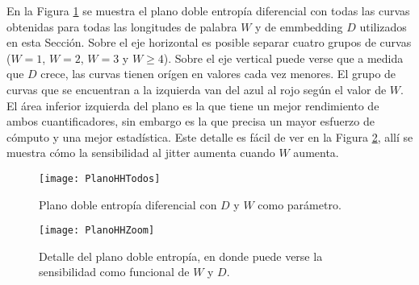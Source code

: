 En la Figura \ref{fig:PlanoHHTodos} se muestra el plano doble entropía diferencial con todas las curvas obtenidas para todas las longitudes de palabra $W$ y de emmbedding $D$ utilizados en esta Sección.
Sobre el eje horizontal es posible separar cuatro grupos de curvas ($W = 1$, $W = 2$, $W = 3$ y $W \geq 4$).
Sobre el eje vertical puede verse que a medida que $D$ crece, las curvas tienen orígen en valores cada vez menores.
El grupo de curvas que se encuentran a la izquierda van del azul al rojo según el valor de $W$.
El área inferior izquierda del plano es la que tiene un mejor rendimiento de ambos cuantificadores, sin embargo es la que precisa un mayor esfuerzo de cómputo y una mejor estadística.
Este detalle es fácil de ver en la Figura \ref{fig:PlanoHHZoom}, allí se muestra cómo la sensibilidad al jitter aumenta cuando $W$ aumenta.
%
\begin{figure}
	\centering
	\texttt{[image: PlanoHHTodos]}
	\caption{Plano doble entropía diferencial con $D$ y $W$ como parámetro.}
	\label{fig:PlanoHHTodos}
\end{figure}
%
\begin{figure}
	\centering
	\texttt{[image: PlanoHHZoom]}
	\caption{Detalle del plano doble entropía, en donde puede verse la sensibilidad como funcional de $W$ y $D$.}
	\label{fig:PlanoHHZoom}
\end{figure}
%